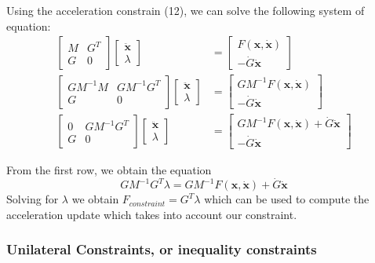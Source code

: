 \documentclass{article}
\begin{document}
Using the acceleration constrain (12), we can solve the following system of equation:
\begin{align*}
\begin{bmatrix}
        M & G^T \\ G & 0
\end{bmatrix} 
\begin{bmatrix}
        \ddot{\mathbf{x}} \\ \lambda
\end{bmatrix} &= 
\begin{bmatrix}
    F(\mathbf{x} ,\dot{\mathbf{x}}) \\ -\dot{G} \dot{\mathbf{x}} 
\end{bmatrix} \\
\begin{bmatrix}
    G M^{-1} M & G M^{-1} G^T \\ G & 0
\end{bmatrix} 
\begin{bmatrix}
        \ddot{\mathbf{x}} \\ \lambda
\end{bmatrix} &= 
\begin{bmatrix}
    G M^{-1} F(\mathbf{x} ,\dot{\mathbf{x}}) \\ -\dot{G} \dot{\mathbf{x}} 
\end{bmatrix} \\
\begin{bmatrix}
    0 & G M^{-1} G^T \\ G & 0
\end{bmatrix} 
\begin{bmatrix}
        \ddot{\mathbf{x}} \\ \lambda
\end{bmatrix} &= 
\begin{bmatrix}
    G M^{-1} F(\mathbf{x} ,\dot{\mathbf{x}}) +\dot{G} \dot{\mathbf{x}} \\ -\dot{G} \dot{\mathbf{x}} 
\end{bmatrix}
\end{align*}

From the first row, we obtain the equation
\[
G M^{-1} G^T \lambda = G M^{-1} F(\mathbf{x}, \dot{\mathbf{x}}) + \dot{G} \dot{\mathbf{x}}
\]
Solving for $\lambda$ we obtain $F_{constraint} = G^T \lambda$ which can be used to compute the acceleration update which takes into account our constraint.
\subsubsection{Unilateral Constraints, or inequality constraints}
\end{document}
